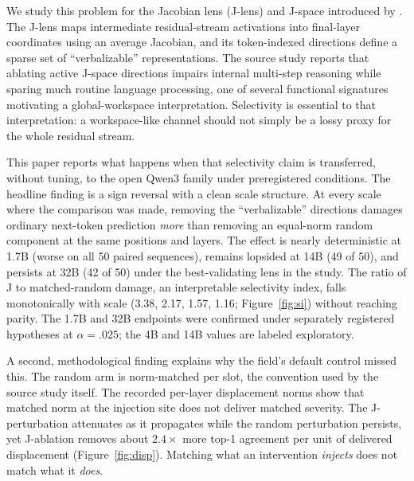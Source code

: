 \documentclass{article}
\newcommand{\jspace}{J-space}
\newcommand{\jlens}{J-lens}
\begin{document}
We study this problem for the Jacobian lens (\jlens{}) and \jspace{} introduced by
\citet{gurnee2026verbalizable}. The \jlens{} maps intermediate residual-stream activations
into final-layer coordinates using an average Jacobian, and its token-indexed directions
define a sparse set of ``verbalizable'' representations. The source study reports that
ablating active \jspace{} directions impairs internal multi-step reasoning while sparing
much routine language processing, one of several functional signatures motivating a
global-workspace interpretation. Selectivity is essential to that interpretation: a
workspace-like channel should not simply be a lossy proxy for the whole residual stream.

This paper reports what happens when that selectivity claim is transferred, without
tuning, to the open Qwen3 family under preregistered conditions. The headline finding is a
sign reversal with a clean scale structure. At every scale where the comparison was
made, removing the ``verbalizable'' directions damages ordinary next-token prediction
\emph{more} than removing an equal-norm random component at the same positions and layers.
The effect is nearly deterministic at 1.7B (worse on all 50 paired sequences), remains
lopsided at 14B (49 of 50), and persists at 32B (42 of 50) under the best-validating lens
in the study. The ratio of J to matched-random damage, an interpretable selectivity
index, falls monotonically with scale (3.38, 2.17, 1.57, 1.16; Figure~\ref{fig:si})
without reaching parity. The 1.7B and 32B endpoints were confirmed under separately
registered hypotheses at $\alpha=.025$; the 4B and 14B values are labeled exploratory.

A second, methodological finding explains why the field's default control missed this.
The random arm is norm-matched per slot, the convention used by the source study itself.
The recorded per-layer displacement norms show that matched norm at the injection site
does not deliver matched severity. The J-perturbation attenuates as it propagates while
the random perturbation persists, yet J-ablation removes about $2.4\times$ more top-1
agreement per unit of delivered displacement (Figure~\ref{fig:disp}). Matching what an
intervention \emph{injects} does not match what it \emph{does}.
\end{document}
